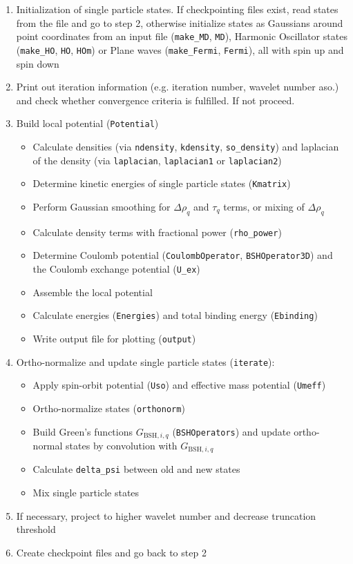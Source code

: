 \documentclass[4p]{elsarticle}
\begin{document}
\begin{enumerate}
\item Initialization of single particle states. If checkpointing files exist, read states from the file and go to step 2, otherwise initialize states as Gaussians around point coordinates from an input file (\texttt{make\_MD}, \texttt{MD}), Harmonic Oscillator states (\texttt{make\_HO}, \texttt{HO}, \texttt{HOm}) or Plane waves (\texttt{make\_Fermi}, \texttt{Fermi}), all with spin up and spin down	
\item Print out iteration information (e.g. iteration number, wavelet number aso.) and check whether convergence criteria is fulfilled. If not proceed. 
\item Build local potential (\texttt{Potential})
	\begin{itemize}
		\item Calculate densities (via \texttt{ndensity}, \texttt{kdensity}, \texttt{so\_density}) and laplacian of the density (via \texttt{laplacian}, \texttt{laplacian1} or  \texttt{laplacian2})
		\item Determine kinetic energies of single particle states (\texttt{Kmatrix})
		\item Perform Gaussian smoothing for $\Delta \rho_q$ and $\tau_q$ terms, or mixing of $\Delta \rho_q$
		\item Calculate density terms with fractional power (\texttt{rho\_power})
		\item Determine Coulomb potential (\texttt{CoulombOperator}, \texttt{BSHOperator3D}) and the Coulomb exchange potential (\texttt{U\_ex}) 
		\item Assemble the local potential
		\item Calculate energies (\texttt{Energies}) and total binding energy (\texttt{Ebinding}) 
		\item Write output file for plotting (\texttt{output})
	\end{itemize}
\item Ortho-normalize and update single particle states (\texttt{iterate}):	
	\begin{itemize}
		\item Apply spin-orbit potential (\texttt{Uso}) and effective mass potential (\texttt{Umeff}) 
		\item Ortho-normalize states (\texttt{orthonorm}) 
		\item Build Green's functions $G_{\mathrm{BSH},i,q}$ (\texttt{BSHOperators}) and update ortho-normal states by convolution with $G_{\mathrm{BSH},i,q}$
		\item Calculate \texttt{delta\_psi} between old and new states
		\item Mix single particle states 
	\end{itemize}
\item If necessary, project to higher wavelet number and decrease truncation threshold
\item Create checkpoint files and go back to step 2
\end{enumerate} 
\end{document}
